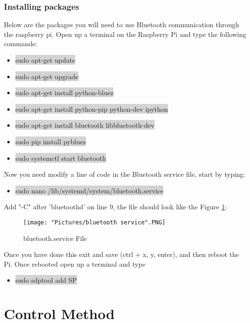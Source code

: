 \documentclass[12pt]{article}
\begin{document}
\subsubsection{Installing packages}
Below are the packages you will need to use Bluetooth communication through the raspberry pi. Open up a terminal on the Raspberry Pi  and type the following commands:
\begin{itemize}
	\item[] \colorbox{lightgray}{sudo apt-get update}
	\item[] \colorbox{lightgray}{sudo apt-get upgrade}
	\item[] \colorbox{lightgray}{sudo apt-get install python-bluez}
	\item[] \colorbox{lightgray}{sudo apt-get install python-pip python-dev ipython}
	\item[] \colorbox{lightgray}{sudo apt-get install bluetooth libbluetooth-dev}
	\item[] \colorbox{lightgray}{sudo pip install pybluez}
	\item[] \colorbox{lightgray}{sudo systemctl start bluetooth}

\end{itemize}

\noindent Now you need modify a line of code in the Bluetooth service file, start by typing:
\begin{itemize}
	\item[] \colorbox{lightgray}{sudo nano /lib/systemd/system/bluetooth.service}
\end{itemize}
\noindent Add "-C" after 'bluetoothd' on line 9, the file should look like the Figure \ref{bs}:

\begin{figure}[H]
 	\centering
	\texttt{[image: "Pictures/bluetooth service".PNG]}
	\caption{bluetooth.service File}
	\label{bs}
\end{figure}
	
\noindent Once you have done this exit and save (ctrl + x, y, enter), and then reboot the Pi. Once rebooted open up a terminal and type
\begin{itemize}
	\item[] \colorbox{lightgray}{sudo sdptool add SP}
\end{itemize}


\section{Control Method}
\end{document}
